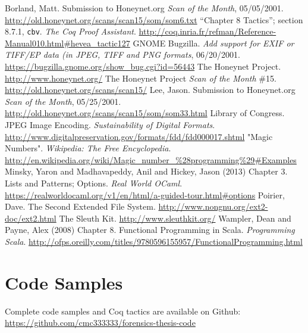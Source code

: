 \documentclass[nocopyrightspace,preprint]{sigplanconf}
\begin{document}




\begin{thebibliography}{}
\softraggedright

  Borland, Matt. Submission to Honeynet.org \emph{Scan of the Month},
  05/05/2001. \url{http://old.honeynet.org/scans/scan15/som/som6.txt}
  ``Chapter 8 Tactics''; section 8.7.1, {\tt cbv}. {\em The Coq Proof
  Assistant}.
  \url{http://coq.inria.fr/refman/Reference-Manual010.html#hevea\_tactic127}
  GNOME Bugzilla. {\em Add support for EXIF or TIFF/EP data (in JPEG, TIFF and
  PNG formats}, 06/20/2001.
  \url{https://bugzilla.gnome.org/show\_bug.cgi?id=56443}
  The Honeynet Project. \url{http://www.honeynet.org/}
  The Honeynet Project \emph{Scan of the Month} \#15.
  \url{http://old.honeynet.org/scans/scan15/}
  Lee, Jason. Submission to Honeynet.org \emph{Scan of the Month}, 05/25/2001.
  \url{http://old.honeynet.org/scans/scan15/som/som33.html}
  Library of Congress. JPEG Image Encoding. {\em Sustainability of Digital
  Formats}.
  \url{http://www.digitalpreservation.gov/formats/fdd/fdd000017.shtml}
  "Magic Numbers". {\em Wikipedia: The Free Encyclopedia}.
  \url{http://en.wikipedia.org/wiki/Magic\_number\_\%28programming\%29#Examples}
  Minsky, Yaron and Madhavapeddy, Anil and Hickey, Jason (2013) Chapter 3.
  Lists and Patterns; Options. {\em Real World OCaml}.
  \url{https://realworldocaml.org/v1/en/html/a-guided-tour.html#options}
  Poirier, Dave. The Second Extended File System.
  \url{http://www.nongnu.org/ext2-doc/ext2.html}
  The Sleuth Kit. \url{http://www.sleuthkit.org/}
  Wampler, Dean and Payne, Alex (2008) Chapter 8. Functional Programming in
  Scala. {\em Programming Scala}. 
  \url{http://ofps.oreilly.com/titles/9780596155957/FunctionalProgramming.html}

\end{thebibliography}

\appendix

\section{Code Samples}
Complete code samples and Coq tactics are available on Github:
\url{https://github.com/cmc333333/forensics-thesis-code}
\end{document}
